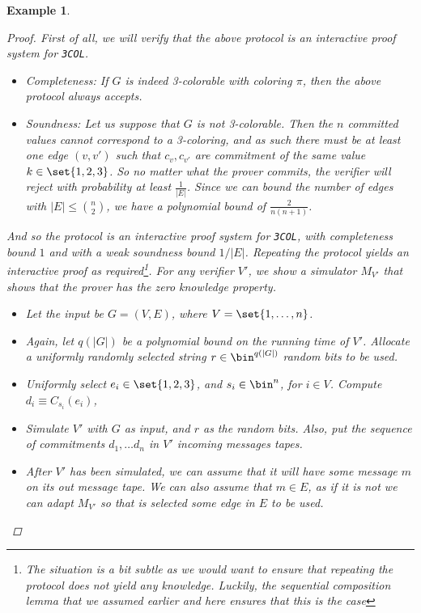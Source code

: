 \documentclass{article}
\newtheorem{example}{Example}
\begin{document}
\begin{example}
\begin{proof}
        First of all, we will verify that the above protocol is an interactive proof system for \texttt{3COL}.
        \begin{itemize}
            \item Completeness: If $G$ is indeed 3-colorable with coloring $\pi$, then the above protocol always accepts.
            \item Soundness: Let us suppose that $G$ is not 3-colorable. Then the $n$ committed values cannot
                  correspond to a 3-coloring, and as such there must be at least one edge $(v, v')$ such that
                  $c_v, c_{v'}$ are commitment of the same value $k \in \set{1, 2, 3}$. So no matter what the
                  prover commits, the verifier will reject with probability at least $\frac{1}{|E|}$. Since we can bound
                  the number of edges with $|E| \leq \binom{n}{2}$, we have a polynomial bound of $\frac{2}{n(n+1)}$.
        \end{itemize}
        And so the protocol is an interactive proof system for \texttt{3COL}, with completeness bound $1$ and
        with a weak soundness bound $1/|E|$. Repeating the protocol yields an interactive proof as required\footnote{The situation is a bit subtle as we would want to ensure that repeating the protocol does not yield any knowledge.
            Luckily, the sequential composition lemma that we assumed earlier and here ensures that this is the case}.
        For any verifier $V'$, we show a simulator $M_{V'}$ that shows that the prover has the zero knowledge property.
        \begin{itemize}
            \item Let the input be $G = (V, E)$, where $V = \set{1, \dots, n }$.
            \item Again, let $q(|G|)$ be a polynomial bound on the running time of $V'$. Allocate a uniformly randomly selected string $r \in \bin^{q(|G|)}$ random bits to be used.
            \item Uniformly select $e_i \in \set{1, 2, 3}$, and $s_i \in \bin^n$, for $i \in V$. Compute $d_i \equiv C_{s_i}(e_i)$,
            \item Simulate $V'$ with $G$ as input, and $r$ as the random bits. Also, put the sequence of commitments $d_1, \dots d_n$ in $V'$ incoming messages tapes.
            \item After $V'$ has been simulated, we can assume that it will have some message $m$ on its out message tape. We can also
                  assume that $m \in E$, as if it is not we can adapt $M_{V'}$ so that is selected some edge in $E$ to be used.

\end{itemize}
\end{proof}
\end{example}
\end{document}

